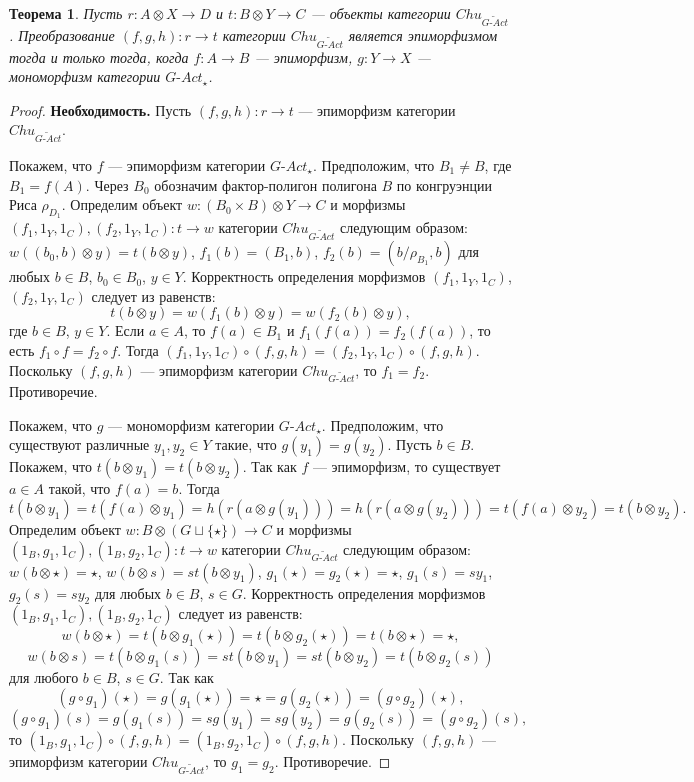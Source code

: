 \documentclass[a4paper,12pt]{article}
\newtheorem{theorem}{Теорема}
\newcommand{\GAct}{G\text{-}Act}
\begin{document}
\begin{theorem}\label{epimorphism-gact}
    Пусть $r: A \otimes X \to D$ и $t: B \otimes Y \to C$ --- объекты категории $Chu_{\widetilde{\GAct}}$. Преобразование $(f,g,h): r \to t$ категории $Chu_{\widetilde{\GAct}}$ является эпиморфизмом тогда и только тогда, когда $f: A \to B$ --- эпиморфизм, $g: Y \to X$ --- мономорфизм категории $\GAct_{\star}$.
\end{theorem}
\begin{proof}
    \textbf{Необходимость.} Пусть $(f,g,h): r \to t$ --- эпиморфизм категории $Chu_{\widetilde{\GAct}}$.

    Покажем, что $f$ --- эпиморфизм категории $\GAct_{\star}$. Предположим, что $B_1 \ne B$, где $B_1 = f(A)$. Через $B_0$ обозначим фактор-полигон полигона $B$ по конгруэнции Риса $\rho_{D_1}$. Определим объект $w: (B_0 \times B) \otimes Y \to C$ и морфизмы $(f_1,1_Y,1_C), (f_2,1_Y,1_C): t \to w$ категории $Chu_{\widetilde{\GAct}}$ следующим образом: $w((b_0,b) \otimes y) = t(b \otimes y)$, $f_1(b) = (B_1,b)$, $f_2(b) = (b/\rho_{B_1},b)$ для любых $b \in B$, $b_0 \in B_0$, $y \in Y$. Корректность определения морфизмов $(f_1,1_Y,1_C)$, $(f_2,1_Y,1_C)$ следует из равенств:
    $$
        t(b \otimes y) = w(f_1(b) \otimes y) = w(f_2(b) \otimes y),
    $$
    где $b \in B$, $y \in Y$. Если $a \in A$, то $f(a) \in B_1$ и $f_1(f(a)) = f_2(f(a))$, то есть $f_1 \circ f = f_2 \circ f$. Тогда $(f_1,1_Y,1_C) \circ (f,g,h) = (f_2,1_Y,1_C) \circ (f,g,h)$. Поскольку $(f,g,h)$ --- эпиморфизм категории $Chu_{\widetilde{\GAct}}$, то $f_1 = f_2$. Противоречие.

    Покажем, что $g$ --- мономорфизм категории $\GAct_{\star}$. Предположим, что существуют различные $y_1, y_2 \in Y$ такие, что $g(y_1) = g(y_2)$. Пусть $b \in B$. Покажем, что $t(b \otimes y_1) = t(b \otimes y_2)$. Так как $f$ --- эпиморфизм, то существует $a \in A$ такой, что $f(a) = b$. Тогда
    $$
        t(b \otimes y_1) = t(f(a) \otimes y_1) = h(r(a \otimes g(y_1))) = h(r(a \otimes g(y_2))) = t(f(a) \otimes y_2) = t(b \otimes y_2).
    $$
    Определим объект $w: B \otimes (G \sqcup \{\star\}) \to C$ и морфизмы $(1_B,g_1,1_C), (1_B,g_2,1_C): t \to w$ категории $Chu_{\widetilde{\GAct}}$ следующим образом: $w(b \otimes \star) = \star$, $w(b \otimes s) = st(b \otimes y_1)$, $g_1(\star) = g_2(\star) = \star$, $g_1(s) = sy_1$, $g_2(s) = sy_2$ для любых $b \in B$, $s \in G$. Корректность определения морфизмов $(1_B,g_1,1_C), (1_B,g_2,1_C)$ следует из равенств:
    $$
        w(b \otimes \star) = t(b \otimes g_1(\star)) = t(b \otimes g_2(\star)) = t(b \otimes \star) = \star,
    $$
    $$
        w(b \otimes s) = t(b \otimes g_1(s)) = st(b \otimes y_1) = st(b \otimes y_2) = t(b \otimes g_2(s))
    $$
    для любого $b \in B$, $s \in G$. Так как
    $$
        (g \circ g_1)(\star) = g(g_1(\star)) = \star = g(g_2(\star)) = (g \circ g_2)(\star),
    $$
    $$
        (g \circ g_1)(s) = g(g_1(s)) = sg(y_1) = sg(y_2) = g(g_2(s)) = (g \circ g_2)(s),
    $$
    то $(1_B,g_1,1_C) \circ (f,g,h) = (1_B,g_2,1_C) \circ (f,g,h)$. Поскольку $(f,g,h)$ --- эпиморфизм категории $Chu_{\widetilde{\GAct}}$, то $g_1 = g_2$. Противоречие.


\end{proof}
\end{document}
